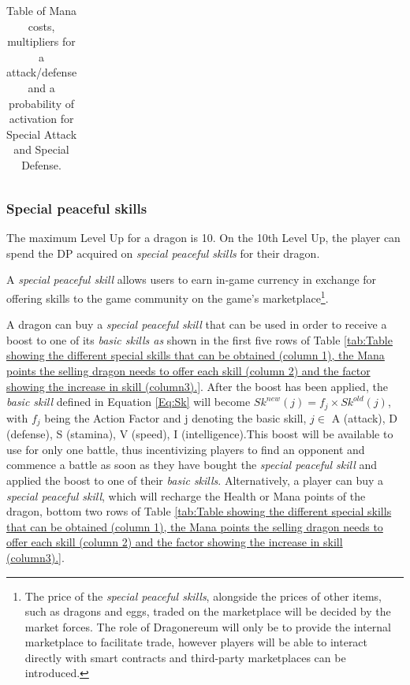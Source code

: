 \documentclass[12pt]{article}
\begin{document}
{\begin{table}[!ht]
\begin{tabular}{p{0.68in}p{0.88in}p{0.88in}p{0.88in}p{0.88in}p{0.88in}}
\end{tabular}\caption{Table of Mana costs, multipliers for a attack/defense and a probability of activation for Special Attack and Special Defense.}
\label{tab:Table of Mana costs, multipliers for a attack/defense and a probability of activation for Special Attack and Special Defense.}

 \end{table}





\subsubsection{Special peaceful skills}\label{Special peaceful skills }\par

The maximum Level Up for a dragon is 10. On the 10th Level Up, the player can spend the DP acquired on \textit{special peaceful skills} for their dragon.\par

A \textit{special peaceful skill} allows users to earn in-game currency in exchange for offering skills to the game community on the game’s marketplace\footnote{The price of the {\it special peaceful skills}, alongside the prices of other items, such as dragons and eggs, traded on the marketplace will be decided by the market forces. The role of Dragonereum will only be to provide the internal marketplace to facilitate trade, however players will be able to interact directly with smart contracts and third-party marketplaces can be introduced.}.\par

A dragon can buy a \textit{special peaceful skill} that can be used in order to receive a boost to one of its \textit{basic skills as }shown in the first five rows of  Table \ref{tab:Table showing the different special skills that can be obtained (column 1), the Mana points the selling dragon needs to offer each skill (column 2) and the factor showing the increase in skill (column3).}. After the boost has been applied, the \textit{basic skill }defined in Equation \ref{Eq:Sk} will become $Sk^{new}(j)=f_j\times Sk^{old}(j)$, with $f_j$ being the Action Factor and j denoting the basic skill, $j \in$  {A (attack), D (defense), S (stamina), V (speed), I (intelligence)}.This boost will be available to use for only one battle, thus incentivizing players to find an opponent and commence a battle as soon as they have bought the \textit{special peaceful skill }and applied the boost to one of their \textit{basic skills}. Alternatively, a player can buy a \textit{special peaceful skill}, which will recharge the Health or Mana points of the dragon, bottom two rows of  Table \ref{tab:Table showing the different special skills that can be obtained (column 1), the Mana points the selling dragon needs to offer each skill (column 2) and the factor showing the increase in skill (column3).}.\par

}
\end{document}

